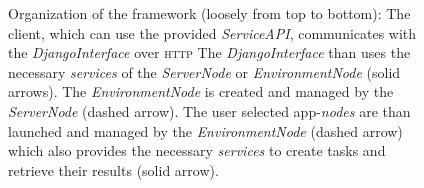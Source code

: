 \documentclass[10pt,a4paper]{article}
\begin{document}
		\begin{figure}
			\begin{center}
				
				\caption{Organization of the framework (loosely from top to bottom): The client,
				which can use the provided \emph{ServiceAPI}, communicates with the
				\emph{DjangoInterface} over \textsc{http} The \emph{DjangoInterface} than uses the
				necessary \emph{services} of the \emph{ServerNode} or \emph{EnvironmentNode} (solid
				arrows). The \emph{EnvironmentNode} is created and managed by the \emph{ServerNode}
				(dashed arrow). The user selected app-\emph{nodes} are than launched and managed by
				the \emph{EnvironmentNode} (dashed arrow) which also provides the necessary
				\emph{services} to create tasks and retrieve their results (solid arrow).}
				\label{fig:diagram}
			\end{center}
		\end{figure}
\end{document}
